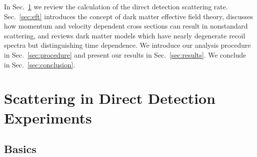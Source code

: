 \documentclass[11pt]{article}
\newcommand{\Sec}[1]{Sec.~\ref{#1}} \newcommand{\Secs}[2]{Secs.~\ref{#1} and \ref{#2}} \newcommand{\Secm}[2]{Secs.~\ref{#1} through \ref{#2}}
\begin{document}






In \Sec{sec:dd} we review the calculation of the direct detection scattering rate. \Sec{sec:eft} introduces the concept of dark matter effective field theory, discusses how momentum and velocity dependent cross sections can result in nonstandard scattering, and reviews dark matter models which have nearly degenerate recoil spectra but distinguishing time dependence. We introduce our analysis procedure in \Sec{sec:procedure} and present our results in \Sec{sec:results}. We conclude in \Sec{sec:conclusion}.


  

\section{Scattering in Direct Detection Experiments}\label{sec:dd}

\subsection{Basics}
\end{document}
